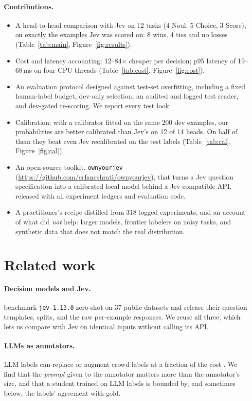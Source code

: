\documentclass[11pt]{article}
\begin{document}
\paragraph{Contributions.}
\begin{itemize}
  \item A head-to-head comparison with Jev on 12 tasks (4 Noul, 5 Choice, 3 Score), on exactly the examples Jev was scored on: 8 wins, 4 ties and no losses (Table~\ref{tab:main}, Figure~\ref{fig:results}).
  \item Cost and latency accounting: 12--84$\times$ cheaper per decision; p95 latency of 19--68\,ms on four CPU threads (Table~\ref{tab:cost}, Figure~\ref{fig:cost}).
  \item An evaluation protocol designed against test-set overfitting, including a fixed human-label budget, dev-only selection, an audited and logged test reader, and dev-gated re-scoring. We report every test look.
  \item Calibration: with a calibrator fitted on the same 200 dev examples, our probabilities are better calibrated than Jev's on 12 of 14 heads. On half of them they beat even Jev recalibrated on the test labels (Table~\ref{tab:cal}, Figure~\ref{fig:cal}).
  \item An open-source toolkit, \texttt{ownyourjev} (\url{https://github.com/erfaneshrati/ownyourjev}), that turns a Jev question specification into a calibrated local model behind a Jev-compatible API, released with all experiment ledgers and evaluation code.
  \item A practitioner's recipe distilled from 318 logged experiments, and an account of what did \emph{not} help: larger models, frontier labelers on noisy tasks, and synthetic data that does not match the real distribution.
\end{itemize}

\section{Related work}
\paragraph{Decision models and Jev.}
\citet{deusser2026jev} benchmark \texttt{jev-1.13.0} zero-shot on 37 public datasets and release their question templates, splits, and the raw per-example responses.
We reuse all three, which lets us compare with Jev on identical inputs without calling its API.

\paragraph{LLMs as annotators.}
LLM labels can replace or augment crowd labels at a fraction of the cost \citep{wang2021want,gilardi2023chatgpt}.
We find that the \emph{prompt} given to the annotator matters more than the annotator's size, and that a student trained on LLM labels is bounded by, and sometimes below, the labels' agreement with gold.
\end{document}
